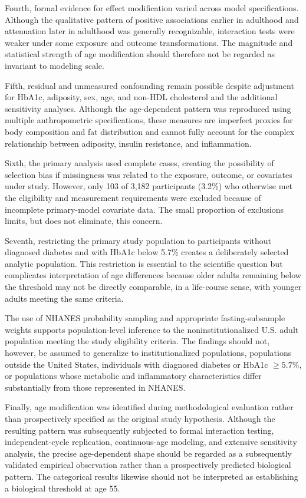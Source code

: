 \documentclass[11pt]{article}
\begin{document}
Fourth, formal evidence for effect modification varied across model
specifications. Although the qualitative pattern of positive associations
earlier in adulthood and attenuation later in adulthood was generally
recognizable, interaction tests were weaker under some exposure and outcome
transformations. The magnitude and statistical strength of age modification
should therefore not be regarded as invariant to modeling scale.

Fifth, residual and unmeasured confounding remain possible despite
adjustment for HbA1c, adiposity, sex, age, and non-HDL cholesterol and
the additional sensitivity analyses. Although the age-dependent pattern
was reproduced using multiple anthropometric specifications, these
measures are imperfect proxies for body composition and fat distribution
and cannot fully account for the complex relationship between adiposity,
insulin resistance, and inflammation.

Sixth, the primary analysis used complete cases, creating the possibility
of selection bias if missingness was related to the exposure, outcome, or
covariates under study. However, only 103 of 3,182 participants (3.2\%)
who otherwise met the eligibility and measurement requirements were
excluded because of incomplete primary-model covariate data. The small
proportion of exclusions limits, but does not eliminate, this concern.

Seventh, restricting the primary study population to participants without
diagnosed diabetes and with HbA1c below 5.7\% creates a deliberately
selected analytic population. This restriction is essential to the
scientific question but complicates interpretation of age differences
because older adults remaining below the threshold may not be directly
comparable, in a life-course sense, with younger adults meeting the same
criteria.

The use of NHANES probability sampling and appropriate fasting-subsample
weights supports population-level inference to the noninstitutionalized
U.S. adult population meeting the study eligibility criteria. The findings
should not, however, be assumed to generalize to institutionalized
populations, populations outside the United States, individuals with
diagnosed diabetes or HbA1c $\geq5.7\%$, or populations whose metabolic
and inflammatory characteristics differ substantially from those
represented in NHANES.

Finally, age modification was identified during methodological evaluation
rather than prospectively specified as the original study hypothesis.
Although the resulting pattern was subsequently subjected to formal
interaction testing, independent-cycle replication, continuous-age
modeling, and extensive sensitivity analysis, the precise age-dependent
shape should be regarded as a subsequently validated empirical observation
rather than a prospectively predicted biological pattern. The categorical
results likewise should not be interpreted as establishing a biological
threshold at age 55.
\end{document}
